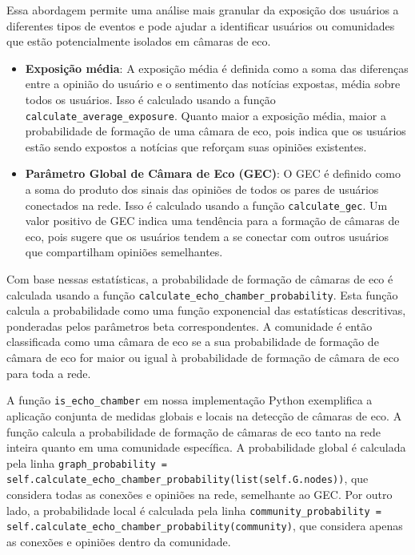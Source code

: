 Essa abordagem permite uma análise mais granular da exposição dos usuários a diferentes tipos de eventos e pode ajudar a identificar usuários ou comunidades que estão potencialmente isolados em câmaras de eco.

\begin{itemize}
	\item \textbf{Exposição média}: A exposição média é definida como a soma das diferenças entre a opinião do usuário e o sentimento das notícias expostas, média sobre todos os usuários. Isso é calculado usando a função \texttt{calculate\_average\_exposure}. Quanto maior a exposição média, maior a probabilidade de formação de uma câmara de eco, pois indica que os usuários estão sendo expostos a notícias que reforçam suas opiniões existentes.
	\item \textbf{Parâmetro Global de Câmara de Eco (GEC)}: O GEC é definido como a soma do produto dos sinais das opiniões de todos os pares de usuários conectados na rede. Isso é calculado usando a função \texttt{calculate\_gec}. Um valor positivo de GEC indica uma tendência para a formação de câmaras de eco, pois sugere que os usuários tendem a se conectar com outros usuários que compartilham opiniões semelhantes.
\end{itemize}

Com base nessas estatísticas, a probabilidade de formação de câmaras de eco é calculada usando a função \texttt{calculate\_echo\_chamber\_probability}. Esta função calcula a probabilidade como uma função exponencial das estatísticas descritivas, ponderadas pelos parâmetros beta correspondentes. A comunidade é então classificada como uma câmara de eco se a sua probabilidade de formação de câmara de eco for maior ou igual à probabilidade de formação de câmara de eco para toda a rede.

A função \texttt{is\_echo\_chamber} em nossa implementação Python exemplifica a aplicação conjunta de medidas globais e locais na detecção de câmaras de eco. A função calcula a probabilidade de formação de câmaras de eco tanto na rede inteira quanto em uma comunidade específica. A probabilidade global é calculada pela linha \texttt{graph\_probability = self.calculate\_echo\_chamber\_probability(list(self.G.nodes))}, que considera todas as conexões e opiniões na rede, semelhante ao GEC. Por outro lado, a probabilidade local é calculada pela linha \texttt{community\_probability = self.calculate\_echo\_chamber\_probability(community)}, que considera apenas as conexões e opiniões dentro da comunidade.


